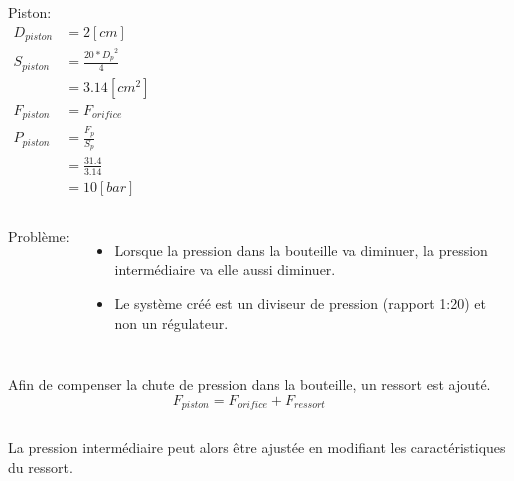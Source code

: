 \documentclass[aspectratio=1610,english,12pt]{beamer}
\begin{document}
\begin{frame}{\insertsubsection}
	\begin{columns}[onlytextwidth]
			Piston:
			\begin{align*}
				D_{piston} &= 2[cm] \\
				S_{piston} &= \tfrac{20*{D_{p}}^2}{4}\\
				  &= 3.14[cm^2] \\
				F_{piston} &= F_{orifice}\\
				P_{piston} &= \tfrac{F_p}{S_p}\\
				  &= \tfrac{31.4}{3.14}\\
				  &= 10 [bar]
			\end{align*}
	\end{columns}
\end{frame}

\begin{frame}{\insertsubsection}
	\begin{columns}[onlytextwidth]
			Problème:
			\begin{itemize}
				\item Lorsque la pression dans la bouteille va diminuer, la pression intermédiaire va elle aussi diminuer.
				\item Le système créé est un diviseur de pression (rapport 1:20) et non un régulateur.
			\end{itemize}
	\end{columns}
\end{frame}

\begin{frame}{\insertsubsection}
	\begin{columns}[onlytextwidth]
			Afin de compenser la chute de pression dans la bouteille, un ressort est ajouté.\\
			$$F_{piston}=F_{orifice}+F_{ressort}$$
	\end{columns}
\end{frame}

\begin{frame}{\insertsubsection}
	\begin{columns}[onlytextwidth]
			La pression intermédiaire peut alors être ajustée en modifiant les caractéristiques du ressort.	
	\end{columns}
\end{frame}
\end{document}
